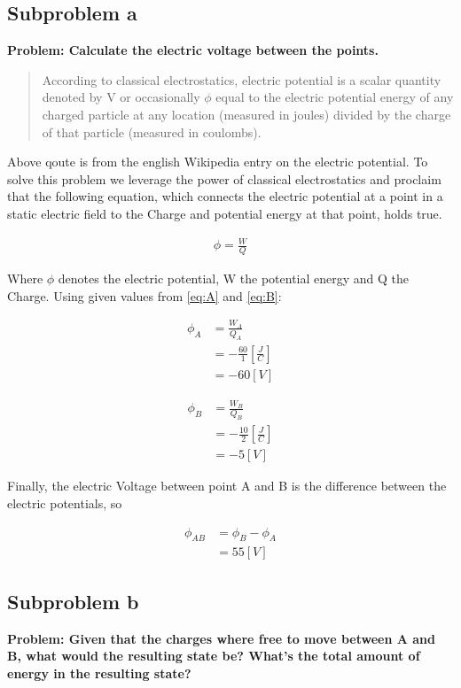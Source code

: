 \documentclass[paper=a4, fontsize=11pt]{scrartcl} %
\numberwithin{equation}{section} %
\numberwithin{figure}{section} %
\numberwithin{table}{section} %
\begin{document}
\subsection{Subproblem a}
\textbf{Problem: Calculate the electric voltage between the points.}

\begin{quotation}
According to classical electrostatics, electric potential is a scalar quantity 
denoted by V or occasionally $\phi$ equal to the electric potential energy of any 
charged particle at any location (measured in joules) divided by the charge of that 
particle (measured in coulombs).
\end{quotation}

Above qoute is from the english Wikipedia entry on the electric potential.
To solve this problem we leverage the power of classical electrostatics and proclaim that the
following equation, which connects the electric potential at a point in a static electric field
to the Charge and potential energy at that point, holds true.

\begin{align} \label{eq:8}
\phi = \frac{W}{Q}
\end{align}

Where $\phi$ denotes the electric potential, W the potential energy and Q the Charge.
Using given values from \ref{eq:A} and \ref{eq:B}:

\begin{align} \label{eq:8}
\phi_A &= \frac{W_A}{Q_A} \\
       &= - \frac{60}{1} \left[ \frac{J}{C} \right] \\
       &= - 60 [V]
\end{align}

\begin{align} \label{eq:8}
\phi_B &= \frac{W_B}{Q_B} \\
       &= - \frac{10}{2} \left[ \frac{J}{C} \right] \\
       &= - 5 [V]
\end{align}

Finally, the electric Voltage between point A and B is the difference between 
the electric potentials, so

\begin{align} \label{eq:8}
\phi_{AB} &= \phi_B - \phi_A \\
       &=  55 [V]
\end{align}

\subsection{Subproblem b}
\textbf{Problem: Given that the charges where free to move between A and B, what would the resulting
state be? What's the total amount of energy in the resulting state?} \\
\end{document}
